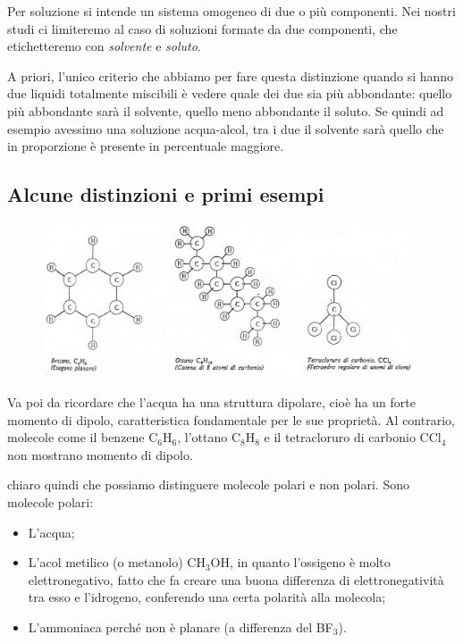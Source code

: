 Per soluzione si intende un sistema omogeneo di due o più componenti. Nei nostri studi ci limiteremo al caso di soluzioni formate da due componenti, che etichetteremo con \textit{solvente} e \textit{soluto}.

A priori, l'unico criterio che abbiamo per fare questa distinzione quando si hanno due liquidi totalmente miscibili è vedere quale dei due sia più abbondante: quello più abbondante sarà il solvente, quello meno abbondante il soluto. Se quindi ad esempio avessimo una soluzione acqua-alcol, tra i due il solvente sarà quello che in proporzione è presente in percentuale maggiore.

\subsection{Alcune distinzioni e primi esempi}

\begin{figure}[htp]
    \centering
    \includegraphics[width=11cm]{immagini/molecole_non_polari.png}
\end{figure}

Va poi da ricordare che l'acqua ha una struttura dipolare, cioè ha un forte momento di dipolo, caratteristica fondamentale per le sue proprietà. Al contrario, molecole come il benzene C$_6$H$_6$, l'ottano C$_8$H$_8$ e il tetracloruro di carbonio CCl$_4$ non mostrano momento di dipolo.

\E chiaro quindi che possiamo distinguere molecole polari e non polari. Sono molecole polari:

\begin{itemize}
    \item L'acqua;
    \item L'acol metilico (o metanolo) CH$_3$OH, in quanto l'ossigeno è molto elettronegativo, fatto che fa creare una buona differenza di elettronegatività tra esso e l'idrogeno, conferendo una certa polarità alla molecola;
    \item L'ammoniaca perché non è planare (a differenza del BF$_3$).
\end{itemize}

